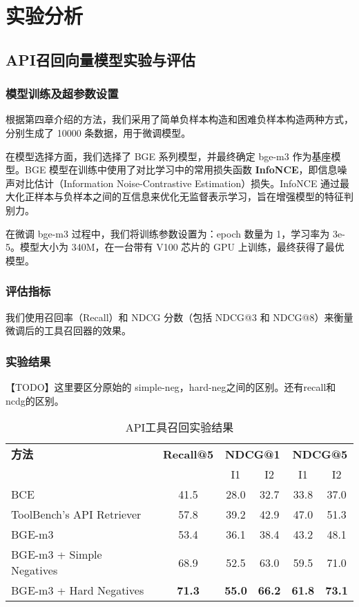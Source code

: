 \chapter{实验分析}

\section{API召回向量模型实验与评估}

\subsection{模型训练及超参数设置}

根据第四章介绍的方法，我们采用了简单负样本构造和困难负样本构造两种方式，分别生成了 10000 条数据，用于微调模型。

在模型选择方面，我们选择了 BGE 系列模型，并最终确定 bge-m3 作为基座模型。BGE 模型在训练中使用了对比学习中的常用损失函数 \textbf{InfoNCE}，即信息噪声对比估计（Information Noise-Contrastive Estimation）损失。InfoNCE 通过最大化正样本与负样本之间的互信息来优化无监督表示学习，旨在增强模型的特征判别力。

在微调 bge-m3 过程中，我们将训练参数设置为：epoch 数量为 1，学习率为 3e-5。模型大小为 340M，在一台带有 V100 芯片的 GPU 上训练，最终获得了最优模型。

\subsection{评估指标}

我们使用召回率（Recall）和 NDCG 分数（包括 NDCG@3 和 NDCG@8）来衡量微调后的工具召回器的效果。

\subsection{实验结果}

【TODO】这里要区分原始的 simple-neg，hard-neg之间的区别。还有recall和ncdg的区别。

\begin{table}[!ht]
  \centering
  \caption{API工具召回实验结果}
  \label{tab:comparison}
  \begin{tabular}{l|c|cc|cc}
    \toprule
    \textbf{方法} & \textbf{Recall@5} & \multicolumn{2}{c|}{\textbf{NDCG@1}} & \multicolumn{2}{c}{\textbf{NDCG@5}} \\
    & & I1 & I2 & I1 & I2 \\
    \midrule
    BCE            & 41.5 & 28.0 & 32.7 & 33.8 & 37.0 \\
    ToolBench's API Retriever & 57.8 & 39.2 & 42.9 & 47.0 & 51.3 \\
    BGE-m3         & 53.4 & 36.1 & 38.4 & 43.2 & 48.1 \\
    BGE-m3 + Simple Negatives   & 68.9 & 52.5 & 63.0 & 59.5 & 71.0 \\
    BGE-m3 + Hard Negatives     & \textbf{71.3} & \textbf{55.0} & \textbf{66.2} & \textbf{61.8} & \textbf{73.1} \\ 
    \bottomrule
  \end{tabular}
\end{table}

